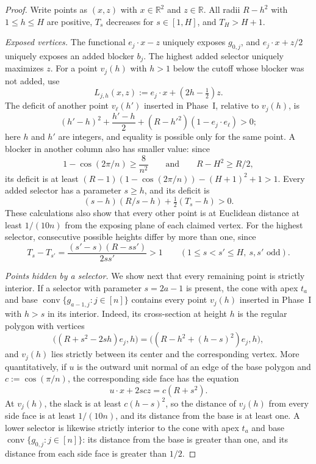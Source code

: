 \begin{proof}
Write points as $(x,z)$ with $x\in\mathbb R^2$ and $z\in\mathbb R$. All radii $R-h^2$ with $1\le h\le H$ are positive, $T_s$ decreases for $s\in[1,H]$, and $T_H>H+1$.

\smallskip\noindent\emph{Exposed vertices.} The functional $e_j\cdot x-z$ uniquely exposes $g_{0,j}$, and $e_j\cdot x+z/2$ uniquely exposes an added blocker $b_j$. The highest added selector uniquely maximizes $z$. For a point $v_j(h)$ with $h>1$ below the cutoff whose blocker was not added, use
\[
 L_{j,h}(x,z):=e_j\cdot x+(2h-\tfrac12)z.
\]
The deficit of another point $v_\ell(h')$ inserted in Phase~I, relative to $v_j(h)$, is
\[
 (h'-h)^2+\frac{h'-h}{2}
 +(R-h'^2)(1-e_j\cdot e_\ell)>0;
\]
here $h$ and $h'$ are integers, and equality is possible only for the same point. A blocker in another column also has smaller value: since
\[
 1-\cos(2\pi/n)\ge\frac8{n^2}\qquad\text{and}\qquad R-H^2\ge R/2,
\]
its deficit is at least $(R-1)(1-\cos(2\pi/n))-(H+1)^2+1>1$. Every added selector has a parameter $s\ge h$, and its deficit is
\[
 (s-h)(R/s-h)+\tfrac12(T_s-h)>0.
\]
These calculations also show that every other point is at Euclidean distance at least $1/(10n)$ from the exposing plane of each claimed vertex. For the highest selector, consecutive possible heights differ by more than one, since
\[
 T_s-T_{s'}=\frac{(s'-s)(R-ss')}{2ss'}>1
 \qquad(1\le s<s'\le H,\ s,s'\text{ odd}).
\]

\smallskip\noindent\emph{Points hidden by a selector.} We show next that every remaining point is strictly interior. If a selector with parameter $s=2a-1$ is present, the cone with apex $t_a$ and base $\operatorname{conv}\{g_{a-1,j}:j\in[n]\}$ contains every point $v_j(h)$ inserted in Phase~I with $h>s$ in its interior. Indeed, its cross-section at height $h$ is the regular polygon with vertices
\[
 \bigl((R+s^2-2sh)e_j,h\bigr)
 =\bigl((R-h^2+(h-s)^2)e_j,h\bigr),
\]
and $v_j(h)$ lies strictly between its center and the corresponding vertex. More quantitatively, if $u$ is the outward unit normal of an edge of the base polygon and $c:=\cos(\pi/n)$, the corresponding side face has the equation
\[
 u\cdot x+2scz=c(R+s^2).
\]
At $v_j(h)$, the slack is at least $c(h-s)^2$, so the distance of $v_j(h)$ from every side face is at least $1/(10n)$, and its distance from the base is at least one. A lower selector is likewise strictly interior to the cone with apex $t_a$ and base $\operatorname{conv}\{g_{0,j}:j\in[n]\}$: its distance from the base is greater than one, and its distance from each side face is greater than $1/2$.


\end{proof}
